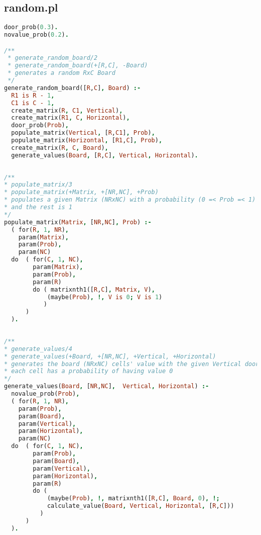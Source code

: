 \documentclass[runningheads]{llncs}
\begin{document}
\subsection{random.pl}

\begin{center}
\begin{minipage}{0.85\textwidth}
\centering\ttfamily
\begin{lstlisting}[language=Prolog]
door_prob(0.3).
novalue_prob(0.2).

/**
 * generate_random_board/2
 * generate_random_board(+[R,C], -Board)
 * generates a random RxC Board
 */
generate_random_board([R,C], Board) :-
  R1 is R - 1,
  C1 is C - 1,
  create_matrix(R, C1, Vertical),
  create_matrix(R1, C, Horizontal),
  door_prob(Prob),
  populate_matrix(Vertical, [R,C1], Prob),
  populate_matrix(Horizontal, [R1,C], Prob),
  create_matrix(R, C, Board),
  generate_values(Board, [R,C], Vertical, Horizontal).
  
\end{lstlisting}
\end{minipage}
\end{center}


\begin{center}
\begin{minipage}{0.85\textwidth}
\centering\ttfamily
\begin{lstlisting}[language=Prolog]
/**
* populate_matrix/3
* populate_matrix(+Matrix, +[NR,NC], +Prob)
* populates a given Matrix (NRxNC) with a probability (0 =< Prob =< 1) of being 0
* and the rest is 1
*/
populate_matrix(Matrix, [NR,NC], Prob) :-
  ( for(R, 1, NR),
    param(Matrix),
    param(Prob),
    param(NC)
  do  ( for(C, 1, NC),
        param(Matrix),
        param(Prob),
        param(R)
        do ( matrixnth1([R,C], Matrix, V),
            (maybe(Prob), !, V is 0; V is 1)
           )
      )
  ).
  
\end{lstlisting}
\end{minipage}
\end{center}


\begin{center}
\begin{minipage}{0.85\textwidth}
\centering\ttfamily
\begin{lstlisting}[language=Prolog]
/**
* generate_values/4
* generate_values(+Board, +[NR,NC], +Vertical, +Horizontal)
* generates the board (NRxNC) cells' value with the given Vertical doors and Horizontal doors
* each cell has a probability of having value 0
*/
generate_values(Board, [NR,NC],  Vertical, Horizontal) :-
  novalue_prob(Prob),
  ( for(R, 1, NR),
    param(Prob),
    param(Board),
    param(Vertical),
    param(Horizontal),
    param(NC)
  do  ( for(C, 1, NC),
        param(Prob),
        param(Board),
        param(Vertical),
        param(Horizontal),
        param(R)
        do (
            (maybe(Prob), !, matrixnth1([R,C], Board, 0), !;
            calculate_value(Board, Vertical, Horizontal, [R,C]))
          )
      )
  ).
  
\end{lstlisting}
\end{minipage}
\end{center}
\end{document}
